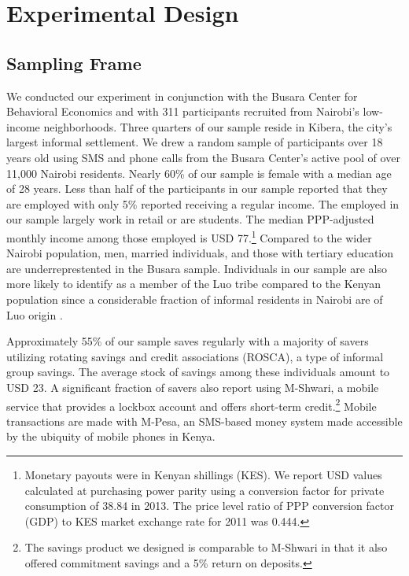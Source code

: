 \documentclass[12pt]{article}
\begin{document}


\section{Experimental Design} \label{sec:design}

	\subsection{Sampling Frame}

		We conducted our experiment in conjunction with the Busara Center for Behavioral Economics and with 311 participants recruited from Nairobi's low-income neighborhoods. Three quarters of our sample reside in Kibera, the city's largest informal settlement. We drew a random sample of participants over 18 years old using SMS and phone calls from the Busara Center's active pool of over 11,000 Nairobi residents. Nearly 60\% of our sample is female with a median age of 28 years. Less than half of the participants in our sample reported that they are employed with only 5\% reported receiving a regular income. The employed in our sample largely work in retail or are students. The median PPP-adjusted monthly income among those employed is USD 77.\footnote{Monetary payouts were in Kenyan shillings (KES). We report USD values calculated at purchasing power parity using a conversion factor for private consumption of 38.84 in 2013. The price level ratio of PPP conversion factor (GDP) to KES market exchange rate for 2011 was 0.444.} Compared to the wider Nairobi population, men, married individuals, and those with tertiary education are underreprestented in the Busara sample. Individuals in our sample are also more likely to identify as a member of the Luo tribe compared to the Kenyan population since a considerable fraction of informal residents in Nairobi are of Luo origin \parencite{haushofer_methodology_2014}.

		Approximately 55\% of our sample saves regularly with a majority of savers utilizing rotating savings and credit associations (ROSCA), a type of informal group savings. The average stock of savings among these individuals amount to USD 23. A significant fraction of savers also report using M-Shwari, a mobile service that provides a lockbox account and offers short-term credit.\footnote{The savings product we designed is comparable to M-Shwari in that it also offered commitment savings and a 5\% return on deposits.} Mobile transactions are made with M-Pesa, an SMS-based money system made accessible by the ubiquity of mobile phones in Kenya.
\end{document}
